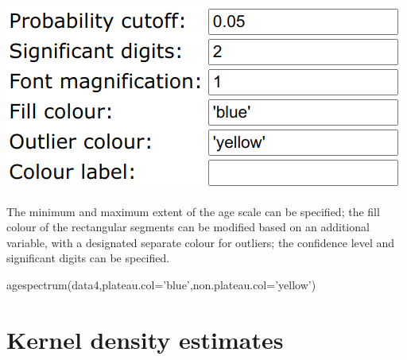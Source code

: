 \begin{refsection}
\begin{enumerate}
\noindent\begin{minipage}[t]{.4\linewidth}
  \strut\vspace*{-\baselineskip}\newline
  \includegraphics[width=\linewidth]{../figures/OtherAgeSpectrumExtraOptions.png}
\end{minipage}
\begin{minipage}[t]{.6\linewidth}
  The minimum and maximum extent of the age scale can be specified;
  the fill colour of the rectangular segments can be modified based on
  an additional variable, with a designated separate colour for
  outliers; the confidence level and significant digits can be
  specified.
\end{minipage}

\begin{console}
agespectrum(data4,plateau.col='blue',non.plateau.col='yellow')
\end{console}
  
\end{enumerate}

\section{Kernel density estimates}\label{sec:OtherKDE}


\end{refsection}
